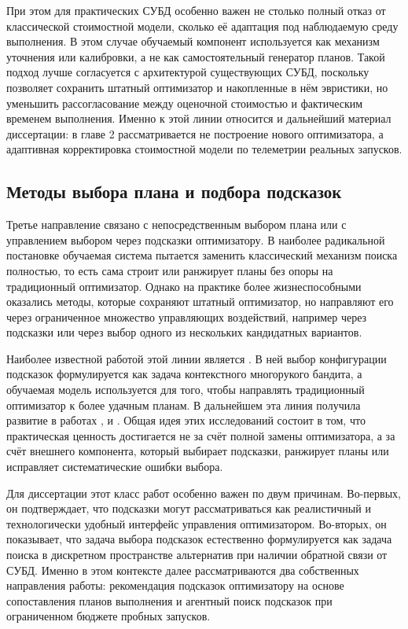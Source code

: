 При этом для практических СУБД особенно важен не столько полный отказ от классической стоимостной модели, сколько её адаптация под наблюдаемую среду выполнения. В этом случае обучаемый компонент используется как механизм уточнения или калибровки, а не как самостоятельный генератор планов. Такой подход лучше согласуется с архитектурой существующих СУБД, поскольку позволяет сохранить штатный оптимизатор и накопленные в нём эвристики, но уменьшить рассогласование между оценочной стоимостью и фактическим временем выполнения. Именно к этой линии относится и дальнейший материал диссертации: в главе 2 рассматривается не построение нового оптимизатора, а адаптивная корректировка стоимостной модели по телеметрии реальных запусков.

\subsection{Методы выбора плана и подбора подсказок}

Третье направление связано с непосредственным выбором плана или с управлением выбором через подсказки оптимизатору. В наиболее радикальной постановке обучаемая система пытается заменить классический механизм поиска полностью, то есть сама строит или ранжирует планы без опоры на традиционный оптимизатор. Однако на практике более жизнеспособными оказались методы, которые сохраняют штатный оптимизатор, но направляют его через ограниченное множество управляющих воздействий, например через подсказки или через выбор одного из нескольких кандидатных вариантов.

Наиболее известной работой этой линии является \cite{10.1145/3448016.3452838}. В ней выбор конфигурации подсказок формулируется как задача контекстного многорукого бандита, а обучаемая модель используется для того, чтобы направлять традиционный оптимизатор к более удачным планам. В дальнейшем эта линия получила развитие в работах \cite{anneser2023autosteer}, \cite{woltmann2023fastgres} и \cite{zhu2023lero}. Общая идея этих исследований состоит в том, что практическая ценность достигается не за счёт полной замены оптимизатора, а за счёт внешнего компонента, который выбирает подсказки, ранжирует планы или исправляет систематические ошибки выбора.

Для диссертации этот класс работ особенно важен по двум причинам. Во-первых, он подтверждает, что подсказки могут рассматриваться как реалистичный и технологически удобный интерфейс управления оптимизатором. Во-вторых, он показывает, что задача выбора подсказок естественно формулируется как задача поиска в дискретном пространстве альтернатив при наличии обратной связи от СУБД. Именно в этом контексте далее рассматриваются два собственных направления работы: рекомендация подсказок оптимизатору на основе сопоставления планов выполнения и агентный поиск подсказок при ограниченном бюджете пробных запусков.

